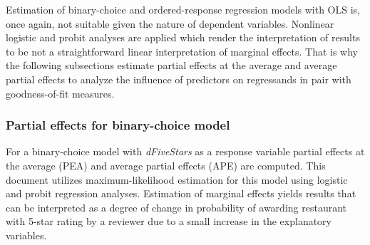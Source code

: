 \documentclass{article}
\begin{document}
Estimation of binary-choice and ordered-response regression
models with OLS is, once again, not suitable given the nature of dependent variables. Nonlinear logistic and probit analyses are applied which render the interpretation of results to be not a straightforward linear interpretation of marginal effects. That is why the following subsections estimate partial effects at the average and average partial effects to analyze the influence of predictors on regressands in pair with goodness-of-fit measures.  

\subsubsection{Partial effects for binary-choice model}

For a binary-choice model with \textit{dFiveStars} as a response variable partial effects at the average (PEA) and average partial effects (APE) are computed. This document utilizes maximum-likelihood estimation for this model using logistic and probit regression analyses. Estimation of marginal effects yields results that can be interpreted as a degree of change in probability of awarding restaurant with 5-star rating by a reviewer due to a small increase in the explanatory variables. 
\end{document}
